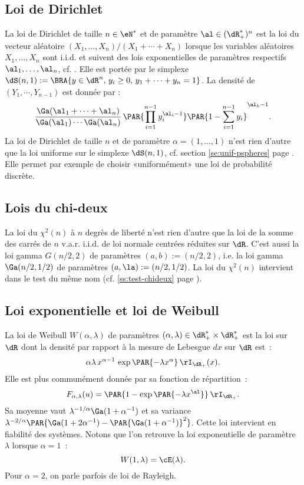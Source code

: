%
\subsection{Loi de Dirichlet}\label{ss:loi:dirichlet}
%

La loi de Dirichlet de taille $n\in\eN^*$ et de paramètre $\al\in(\dR_+^*)^n$ est
la loi du vecteur aléatoire $(X_1,\ldots,X_n)/(X_1+\cdots+X_n)$ lorsque les variables
aléatoires $X_1,\ldots,X_n$ sont i.i.d. et suivent des lois exponentielles de
paramètres respectifs $\al_1,\ldots,\al_n$, cf. \cite[exercice 8.2.15, page
192]{dacunha-castelle-duflo}. Elle est portée par le simplexe
$\dS(n,1):=\BRA{y\in\dR^n,\,y_i\geq 0,\,y_1+\cdots+y_n=1}$. La densité de
$(Y_1,\cdots,Y_{n-1})$ est donnée par :
$$
\frac{\Ga(\al_1+\cdots+\al_n)}{\Ga(\al_1)\cdots\Ga(\al_n)}
\,\PAR{\prod_{i=1}^{n-1}y_i^{\al_i-1}}\PAR{1-\sum_{i=1}^{n-1}y_i}^{\al_k-1}.
$$
La loi de Dirichlet de taille $n$ et de paramètre $\alpha=(1,\ldots,1)$ n'est rien
d'autre que la loi uniforme sur le simplexe $\dS(n,1)$, cf. section
\ref{se:unif-pspheres} page \pageref{se:unif-pspheres}. Elle permet par
exemple de choisir «uniformément» une loi de probabilité discrète.

%
\subsection{Lois du chi-deux}\label{ss:loi:chideux}
%

La loi du $\chi^2(n)$ à $n$ degrès de liberté n'est rien d'autre que la loi de la
somme des carrés de $n$ v.a.r. i.i.d. de loi normale centrées réduites sur
$\dR$. C'est aussi la loi gamma $G(n/2,2)$ de paramètres $(a,b):=(n/2,2)$,
i.e. la loi gamma $\Ga(n/2,1/2)$ de paramètres $(a,\la):=(n/2,1/2)$. La loi du
$\chi^2(n)$ intervient dans le test du même nom (cf. \ref{ss:test-chideux} page
\pageref{ss:test-chideux}).

%
\subsection{Loi exponentielle et loi de Weibull}\label{ss:loi:weibull}
%

La loi de Weibull $W(\alpha,\lambda)$ de paramètres $(\alpha,\lambda)\in\dR_+^*\times\dR_+^*$ est la loi sur
$\dR$ dont la densité par rapport à la mesure de Lebesgue $dx$ sur $\dR$ est~:
$$
\alpha\lambda\,x^{\alpha-1}\,\exp\PAR{-\lambda x^\alpha}\,\rI_{\dR_+}(x).
$$
Elle est plus communément donnée par sa fonction de répartition~:
$$
F_{\alpha,\lambda}(u)=\PAR{1-\exp\PAR{-\lambda x^\al}}\,\rI_{\dR_+}.
$$
Sa moyenne vaut $\lambda^{-1/\alpha}\Ga(1+\alpha^{-1})$ et sa variance
$\lambda^{-2/\alpha}\PAR{\Ga(1+2\alpha^{-1})-\PAR{\Ga(1+\alpha^{-1})}^2}$. Cette loi
intervient en fiabilité des systèmes. Notons que l'on retrouve la loi
exponentielle de paramètre $\lambda$ lorsque $\alpha=1$~:
$$
W(1,\lambda)=\cE(\lambda).
$$
Pour $\alpha=2$, on parle parfois de loi de Rayleigh.

